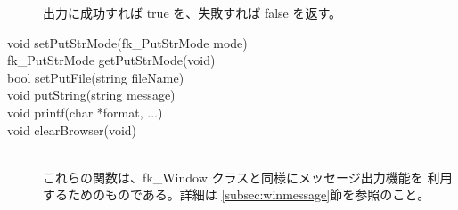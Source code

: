\begin{description}
	出力に成功すれば true を、失敗すれば false を返す。\\

 \item[\hspace*{0.6cm}void setPutStrMode(fk\_PutStrMode mode)]
 \item[\hspace*{0.6cm}fk\_PutStrMode getPutStrMode(void)]
 \item[\hspace*{0.6cm}bool setPutFile(string fileName)]
 \item[\hspace*{0.6cm}void putString(string message)]
 \item[\hspace*{0.6cm}void printf(char *format, ...)]
 \item[\hspace*{0.6cm}void clearBrowser(void)] ~ \\
	これらの関数は、fk\_Window クラスと同様にメッセージ出力機能を
	利用するためのものである。詳細は \ref{subsec:winmessage}節を参照のこと。

\end{description}
